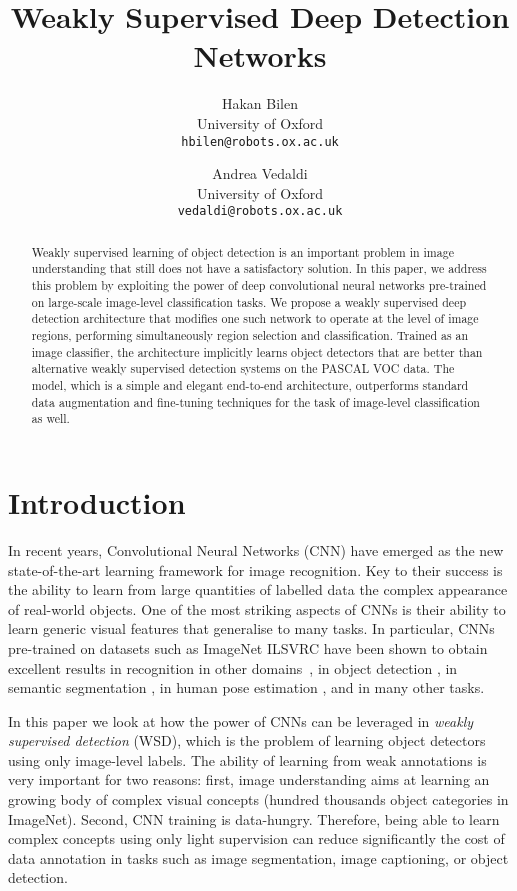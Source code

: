 \documentclass[10pt,twocolumn,letterpaper]{article}
\begin{document}
\title{Weakly Supervised Deep Detection Networks}
\author{Hakan Bilen\\
University of Oxford\\
{\tt\small hbilen@robots.ox.ac.uk}
\and
Andrea Vedaldi\\
University of Oxford\\
{\tt\small vedaldi@robots.ox.ac.uk}
}



\maketitle
\begin{abstract}
Weakly supervised learning of object detection is an important problem in image understanding that still does not have a satisfactory solution.  In this paper, we address this problem by exploiting the power of deep convolutional neural networks pre-trained on large-scale image-level classification tasks. We propose a weakly supervised deep detection architecture that modifies one such network to operate at the level of image regions, performing simultaneously region selection and classification. Trained as an image classifier, the architecture implicitly learns object detectors that are better than alternative weakly supervised detection systems on the PASCAL VOC data. The model, which is a simple and elegant end-to-end architecture, outperforms standard data augmentation and fine-tuning techniques for the task of image-level classification as well.
 \end{abstract}

\section{Introduction}\label{s:intro}
In recent years, Convolutional Neural Networks (CNN) \cite{Lecun89} have emerged as the new state-of-the-art learning framework for image recognition. Key to their success is the ability to learn from large quantities of labelled data the complex appearance of real-world objects. One of the most striking aspects of CNNs is their ability to learn generic visual features that generalise to many tasks. In particular, CNNs pre-trained on datasets such as ImageNet ILSVRC have been shown to obtain excellent results in recognition in other domains~\cite{Donahue13}, in object detection \cite{Girshick14}, in semantic segmentation \cite{Hariharan14}, in human pose estimation \cite{Toshev13}, and in many other tasks.

In this paper we look at how the power of CNNs can be leveraged in  \emph{weakly supervised detection} (WSD), which is the problem of learning object detectors using only image-level labels. The ability of learning from weak annotations is very important for two reasons: first, image understanding aims at learning an growing body of complex visual concepts (\eg hundred thousands object categories in ImageNet). Second, CNN training is data-hungry. Therefore, being able to learn complex concepts using only light supervision can reduce significantly the cost of data annotation in tasks such as image segmentation, image captioning, or object detection.
\end{document}
